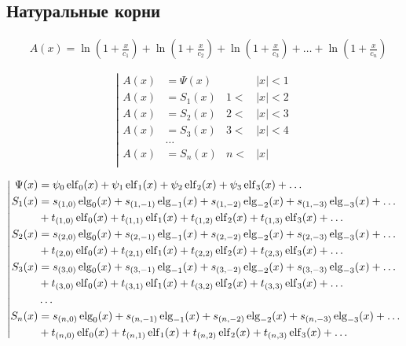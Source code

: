 
\subsection{Натуральные корни}

\begin{equation*} \begin{aligned}
&A(x) =
  \ln{\left(1 + \frac{x}{c_1} \right)}
+ \ln{\left(1 + \frac{x}{c_2} \right)}
+ \ln{\left(1 + \frac{x}{c_3} \right)}
+ \ldots
+ \ln{\left(1 + \frac{x}{c_n} \right)}
\end{aligned} \end{equation*}

\begin{equation*} \left| \begin{aligned}
A(x) &= \Psi(x) & 
&|x| < 1 \\
%
A(x) &= S_1(x) & 
1 < &|x| < 2 \\
%
A(x) &= S_2(x) & 
2 < &|x| < 3 \\
%
A(x) &= S_3(x) &
3 < &|x| < 4 \\
&\ldots & & \\
%
A(x) &= S_n(x) &
n < &|x| \\
\end{aligned} \right. \end{equation*}

\begin{equation*} \left| \begin{aligned}
\Psi(x) &=
  \psi_0 \elf_0(x)
+ \psi_1 \elf_1(x) 
+ \psi_2 \elf_2(x) 
+ \psi_3 \elf_3(x) 
+ \ldots \\
%
S_1(x) &=
  s_{(1,0)} \elg_0(x) 
+ s_{(1,-1)} \elg_{-1}(x)
+ s_{(1,-2)} \elg_{-2}(x)
+ s_{(1,-3)} \elg_{-3}(x)
+ \ldots \\ &
+ t_{(1,0)} \elf_0(x)
+ t_{(1,1)} \elf_1(x)
+ t_{(1,2)} \elf_2(x)
+ t_{(1,3)} \elf_3(x)
+ \ldots \\
%
S_2(x) &= 
  s_{(2,0)} \elg_0(x)
+ s_{(2,-1)} \elg_{-1}(x)
+ s_{(2,-2)} \elg_{-2}(x)
+ s_{(2,-3)} \elg_{-3}(x)
+ \ldots \\ &
+ t_{(2,0)} \elf_0(x)
+ t_{(2,1)} \elf_1(x)
+ t_{(2,2)} \elf_2(x)
+ t_{(2,3)} \elf_3(x)
+ \ldots \\
%
S_3(x) &= 
  s_{(3,0)} \elg_0(x)
+ s_{(3,-1)} \elg_{-1}(x)
+ s_{(3,-2)} \elg_{-2}(x)
+ s_{(3,-3)} \elg_{-3}(x)
+ \ldots \\ &
+ t_{(3,0)} \elf_0(x)
+ t_{(3,1)} \elf_1(x)
+ t_{(3,2)} \elf_2(x)
+ t_{(3,3)} \elf_3(x)
+ \ldots \\
%
&\ldots \\
%
S_n(x) &= 
  s_{(n,0)} \elg_0(x)
+ s_{(n,-1)} \elg_{-1}(x)
+ s_{(n,-2)} \elg_{-2}(x)
+ s_{(n,-3)} \elg_{-3}(x)
+ \ldots \\ &
+ t_{(n,0)} \elf_0(x)
+ t_{(n,1)} \elf_1(x)
+ t_{(n,2)} \elf_2(x)
+ t_{(n,3)} \elf_3(x)
+ \ldots \\
\end{aligned} \right. \end{equation*}

